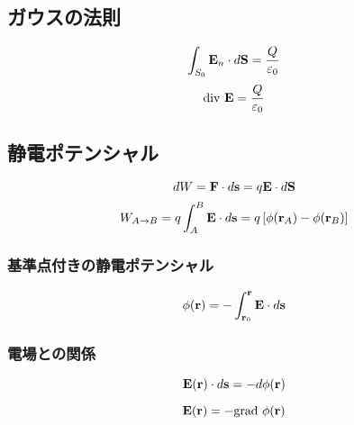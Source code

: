 \subsection{ガウスの法則}
\[ \int_{S_0} {\bf E}_n \cdot d{\bf S} = \frac{Q}{\varepsilon_0} \]
\[ \div {\bf E} = \frac{Q}{\varepsilon_0} \]


\subsection{静電ポテンシャル}
\[ dW = {\bf F} \cdot d{\bf s} = q{\bf E}\cdot d{\bf S} \]
\[ W_{A\rightarrow B} = q \int_{A}^{B} {\bf E} \cdot d{\bf s} = q \left[ \phi ({\bf r}_A) - \phi ({\bf r}_B) \right] \]


\subsubsection{基準点付きの静電ポテンシャル}
\[ \phi ({\bf r}) = - \int_{{\bf r}_0}^{{\bf r}} {\bf E} \cdot d{\bf s} \]


\subsubsection{電場との関係}
\begin{equation}
  {\bf E} ({\bf r}) \cdot d{\bf s} = -d \phi ({\bf r})
\end{equation}

\begin{equation}
  {\bf E} ({\bf r}) = - \grad \phi ({\bf r})
\end{equation}
